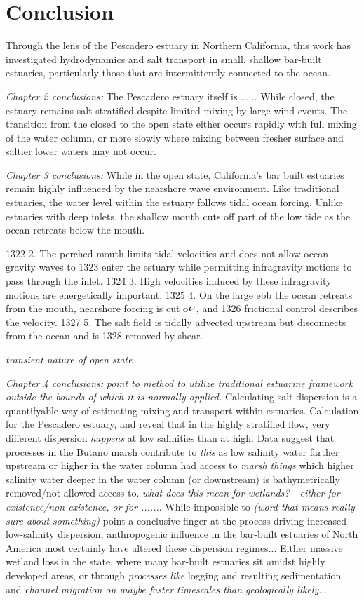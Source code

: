 \chapter{Conclusion}
\label{conclusion}

Through the lens of the Pescadero estuary in Northern California, this work has investigated hydrodynamics and salt transport in small, shallow bar-built estuaries, particularly those that are intermittently connected to the ocean. 

\emph{Chapter 2 conclusions:}
The Pescadero estuary itself is ...... While closed, the estuary remains salt-stratified despite limited mixing by large wind events. The transition from the closed to the open state either occurs rapidly with full mixing of the water column, or more slowly where mixing between fresher surface and saltier lower waters may not occur. 

\emph{Chapter 3 conclusions:}
While in the open state, California's bar built estuaries remain highly influenced by the nearshore wave environment. Like traditional estuaries, the water level within the estuary follows tidal ocean forcing. Unlike estuaries with deep inlets, the shallow mouth cuts off part of the low tide as the ocean retreats below the mouth. 


1322 2. The perched mouth limits tidal velocities and does not allow ocean gravity waves to
1323 enter the estuary while permitting infragravity motions to pass through the inlet.
1324 3. High velocities induced by these infragravity motions are energetically important.
1325 4. On the large ebb the ocean retreats from the mouth, nearshore forcing is cut o↵, and
1326 frictional control describes the velocity.
1327 5. The salt field is tidally advected upstream but disconnects from the ocean and is
1328 removed by shear.

\emph{transient nature of open state}


\emph{Chapter 4 conclusions:} \emph{point to method to utilize traditional estuarine framework outside the bounds of which it is normally applied.}
Calculating salt dispersion is a quantifyable way of estimating mixing and transport within estuaries. Calculation for the Pescadero estuary, and reveal that in the highly stratified flow, very different dispersion \emph{happens} at low salinities than at high. Data suggest that processes in the Butano marsh contribute to \emph{this} as low salinity water farther upstream or higher in the water column had access to \emph{marsh things} which higher salinity water deeper in the water column (or downstream) is bathymetrically removed/not allowed access to.  \emph{what does this mean for wetlands? - either for existence/non-existence, or for ......}.  While impossible to \emph{(word that means really sure about something)} point a conclusive finger at the process driving increased low-salinity dispersion, anthropogenic influence in the bar-built estuaries of North America most certainly have altered these dispersion regimes... Either massive wetland loss in the state, where many bar-built estuaries sit amidst highly developed areas, or through \emph{processes like} logging and resulting sedimentation and \emph{channel migration on maybe faster timescales than geologically likely}... 

